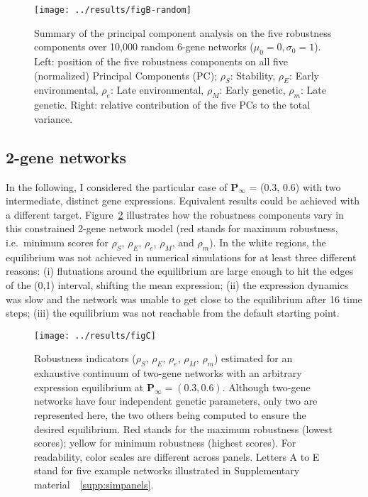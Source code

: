 \documentclass[a4paper]{article}
\newcommand{\stability}{{\rho_S}}
\newcommand{\earlyenv}{{\rho_E}}
\newcommand{\lateenv}{{\rho_e}}
\newcommand{\earlymut}{{\rho_M}}
\newcommand{\latemut}{{\rho_m}}
\newcommand{\SupMat}{Supplementary material~}
\begin{document}
\begin{figure}[t]
\begin{center}
\texttt{[image: ../results/figB-random]}
\caption{\label{fig:pca} Summary of the principal component analysis on the five robustness components over 10,000 random 6-gene networks ($\mu_0=0, \sigma_0=1$). Left: position of the five robustness components on all five (normalized) Principal Components (PC); $\stability$: Stability, $\earlyenv$: Early environmental, $\lateenv$: Late environmental, $\earlymut$: Early genetic, $\latemut$: Late genetic. Right: relative contribution of the five PCs to the total variance.}
\end{center}
\end{figure}

\subsection{2-gene networks}

In the following, I considered the particular case of $\bm P_\infty$ = (0.3, 0.6) with two intermediate, distinct gene expressions. Equivalent results could be achieved with a different target. Figure~\ref{fig:imgpanels} illustrates how the robustness components vary in this constrained 2-gene network model (red stands for maximum robustness, i.e.\ minimum scores for $\stability$, $\earlyenv$, $\lateenv$, $\earlymut$, and $\latemut$). In the white regions, the equilibrium was not achieved in numerical simulations for at least three different reasons: (i) flutuations around the equilibrium are large enough to hit the edges of the (0,1) interval, shifting the mean expression; (ii) the expression dynamics was slow and the network was unable to get close to the equilibrium after 16 time steps; (iii) the equilibrium was not reachable from the default starting point.

\begin{figure}[t]
\begin{center}
\texttt{[image: ../results/figC]}
\caption{\label{fig:imgpanels} Robustness indicators ($\stability$, $\earlyenv$, $\lateenv$, $\earlymut$, $\latemut$) estimated for an exhaustive continuum of two-gene networks with an arbitrary expression equilibrium at $\bm P_\infty = (0.3, 0.6)$. Although two-gene networks have four independent genetic parameters, only two are represented here, the two others being computed to ensure the desired equilibrium. Red stands for the maximum robustness (lowest scores); yellow for minimum robustness (highest scores). For readability, color scales are different across panels. Letters A to E stand for five example networks illustrated in \SupMat~\ref{supp:simpanels}.}
\end{center}
\end{figure}
\end{document}
